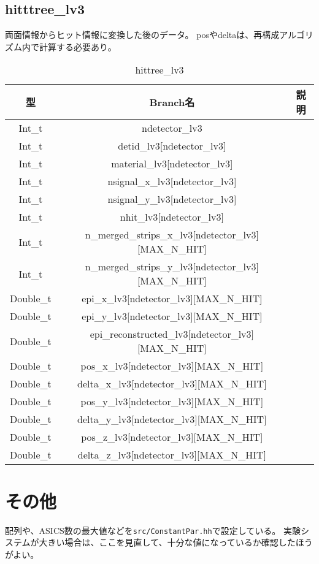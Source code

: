 \documentclass[10.5pt]{jsarticle}
\begin{document}
\subsection{hitttree\_lv3}
両面情報からヒット情報に変換した後のデータ。
posやdeltaは、再構成アルゴリズム内で計算する必要あり。

\begin{table}[htb]
\begin{center}
\begin{tabular}{|c|c|c|} \hline
    型 & Branch名 & 説明 \\ \hline
Int\_t & ndetector\_lv3& \\
Int\_t & detid\_lv3[ndetector\_lv3]& \\
Int\_t & material\_lv3[ndetector\_lv3]& \\
Int\_t & nsignal\_x\_lv3[ndetector\_lv3]& \\
Int\_t & nsignal\_y\_lv3[ndetector\_lv3]& \\
Int\_t & nhit\_lv3[ndetector\_lv3]& \\
Int\_t & n\_merged\_strips\_x\_lv3[ndetector\_lv3][MAX\_N\_HIT]& \\
Int\_t & n\_merged\_strips\_y\_lv3[ndetector\_lv3][MAX\_N\_HIT]& \\
Double\_t & epi\_x\_lv3[ndetector\_lv3][MAX\_N\_HIT]& \\
Double\_t & epi\_y\_lv3[ndetector\_lv3][MAX\_N\_HIT]& \\
Double\_t & epi\_reconstructed\_lv3[ndetector\_lv3][MAX\_N\_HIT]& \\
Double\_t & pos\_x\_lv3[ndetector\_lv3][MAX\_N\_HIT]& \\
Double\_t & delta\_x\_lv3[ndetector\_lv3][MAX\_N\_HIT]& \\
Double\_t & pos\_y\_lv3[ndetector\_lv3][MAX\_N\_HIT]& \\
Double\_t & delta\_y\_lv3[ndetector\_lv3][MAX\_N\_HIT]& \\
Double\_t & pos\_z\_lv3[ndetector\_lv3][MAX\_N\_HIT]& \\
Double\_t & delta\_z\_lv3[ndetector\_lv3][MAX\_N\_HIT]& \\
\hline
  \end{tabular}
      \caption{hittree\_lv3}
 \end{center}
\end{table}

\section{その他}
配列や、ASICS数の最大値などを{\tt src/ConstantPar.hh}で設定している。
実験システムが大きい場合は、ここを見直して、十分な値になっているか確認したほうがよい。
\end{document}
